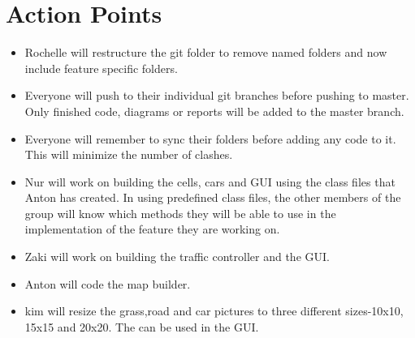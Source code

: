 \documentclass{article}
\begin{document}
	\section*{ Action Points}
	\begin{itemize}
		\item Rochelle will restructure the git folder to remove named folders and now include feature specific folders.
		\item Everyone will push to their individual git branches before pushing to master. 
		Only finished code, diagrams or reports will be added to the master branch. 
		\item Everyone will remember to sync their folders before adding any code to it. 
		This will minimize the number of clashes. 
		\item Nur will work on building the cells, cars and GUI using the class files that Anton has created. 
		In using predefined class files, the other members of the group will know which methods they will be able to use in the implementation of the feature they are working on.
		\item Zaki will work on building the traffic controller and the GUI. 
		\item Anton will code the map builder.
		\item kim will resize the grass,road and car pictures to three different sizes-10x10, 15x15 and 20x20. 
		The can be used in the GUI.
	\end{itemize}
	
	
		
	
\end{document}
